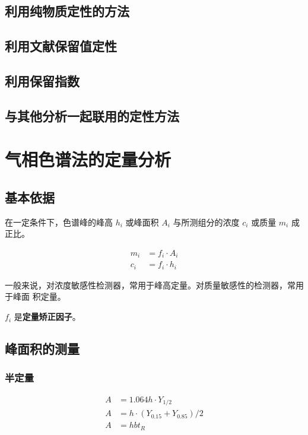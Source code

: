 \subsection{利用纯物质定性的方法}

\subsection{利用文献保留值定性}

\subsection{利用保留指数}

\subsection{与其他分析一起联用的定性方法}


\section{气相色谱法的定量分析}


\subsection{基本依据}

在一定条件下，色谱峰的峰高 $h_i$ 或峰面积 $A_i$ 与所测组分的浓度 $c_i$ 或质量
$m_i$ 成正比。

\begin{align}
    m_i & = f_i \cdot A_i \\
    c_i & = f_i \cdot h_i
\end{align}

一般来说，对浓度敏感性检测器，常用于峰高定量。对质量敏感性的检测器，常用于峰面
积定量。

$f_i$ 是\textbf{定量矫正因子}。

\subsection{峰面积的测量}

\subsubsection{半定量}

\begin{align}
    A & = 1.064 h \cdot Y_{1/2}             \\
    A & = h \cdot (Y_{0.15} + Y_{0.85}) / 2 \\
    A & = h b t_R
\end{align}

